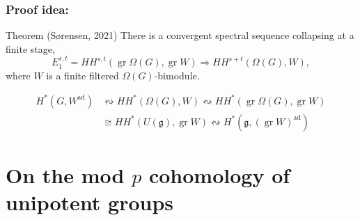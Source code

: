 \documentclass{beamer}
\newcommand*\Z{\mathbb{Z}}
\newcommand*\F{\mathbb{F}}
\DeclareMathOperator{\gr}{gr} %
\DeclareMathOperator{\Lie}{Lie}
\newcommand*{\lie}[1]{\mathfrak{#1}} %
\newcommand*\iso{\cong} %
\newcommand*\gs[1]{\mathcal{#1}}
\begin{document}
\begin{frame}
  \frametitle{Proof idea:}

  \begin{block}{Theorem (Sørensen, 2021)}
    There is a convergent spectral sequence collapsing at a finite stage,
    \[
      E_{1}^{s,t} = HH^{s,t}(\gr \Omega(G),\gr W) \Longrightarrow HH^{s+t}(\Omega(G),W),
    \]
    where $W$ is a finite filtered $\Omega(G)$-bimodule.
  \end{block}

  \begin{align*}
    H^{*}(G,W^{\mathrm{ad}}) &\leftrightsquigarrow HH^{*}(\Omega(G),W) \leftrightsquigarrow HH^{*}(\gr \Omega(G),\gr W) \\
    &\iso HH^{*}(U(\lie{g}),\gr W) \leftrightsquigarrow H^{*}(\lie{g},(\gr W)^{\mathrm{ad}})
  \end{align*}
\end{frame}




\section[mod \texorpdfstring{$p$}{p} cohomology of unipotent groups]{On the mod \texorpdfstring{$p$}{p} cohomology of unipotent groups}




\end{document}
